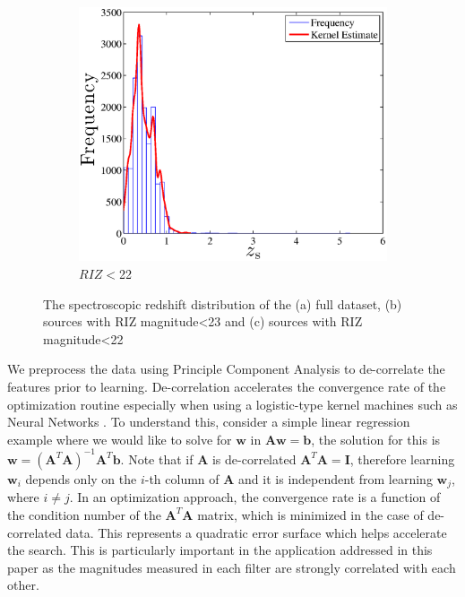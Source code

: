 \documentclass[useAMS,usenatbib,fleqn]{mn2e}
\begin{document}
\begin{figure}
        ~
        \begin{subfigure}[b]{1\columnwidth}
                 \includegraphics[width=\textwidth]{figures/zspec_22.eps}
                 \caption{$RIZ<$22}
        \end{subfigure}
        
       \caption{The spectroscopic redshift distribution of the (a) full dataset, (b) sources with RIZ magnitude\textless23 and (c) sources with RIZ magnitude\textless22}
	 \label{fig-zspec-histogram}
\end{figure}

We preprocess the data using Principle Component Analysis \citep[PCA;][]{jolliffe1986} to de-correlate the features prior to learning. De-correlation accelerates the convergence rate of the optimization routine especially when using a logistic-type kernel machines such as Neural Networks \citep{lecun1998}. To understand this, consider a simple linear regression example where we would like to solve for $\mathbf{w}$ in $\mathbf{A}\mathbf{w}=\mathbf{b}$, the solution for this is $\mathbf{w}=\left(\mathbf{A}^{T}\mathbf{A}\right)^{-1}\mathbf{A}^{T}\mathbf{b}$. Note that if $\mathbf{A}$ is de-correlated $\mathbf{A}^{T}\mathbf{A}=\mathbf{I}$, therefore learning $\mathbf{w}_{i}$ depends only on the $i$-th column of $\mathbf{A}$ and it is independent from learning $\mathbf{w}_{j}$, where $i\ne j$. In an optimization approach, the convergence rate is a function of the condition number of the $\mathbf{A}^{T}\mathbf{A}$ matrix, which is minimized in the case of de-correlated data. This represents a quadratic error surface which helps accelerate the search. This is particularly important in the application addressed in this paper as the magnitudes measured in each filter are strongly correlated with each other. 
\end{document}
